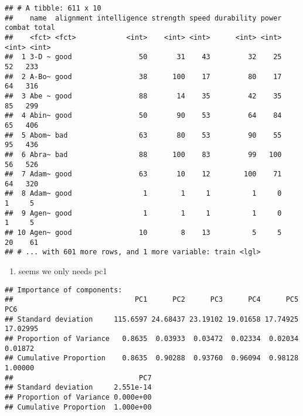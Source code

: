 \documentclass[]{article}
\newenvironment{Shaded}{\begin{snugshade}}{\end{snugshade}}
\newcommand{\DecValTok}[1]{\textcolor[rgb]{0.00,0.00,0.81}{#1}}
\newcommand{\KeywordTok}[1]{\textcolor[rgb]{0.13,0.29,0.53}{\textbf{#1}}}
\newcommand{\NormalTok}[1]{#1}
\newcommand{\OperatorTok}[1]{\textcolor[rgb]{0.81,0.36,0.00}{\textbf{#1}}}
\newcommand{\StringTok}[1]{\textcolor[rgb]{0.31,0.60,0.02}{#1}}
\providecommand{\tightlist}{%
  \setlength{\itemsep}{0pt}\setlength{\parskip}{0pt}}
\begin{document}
\begin{verbatim}
## # A tibble: 611 x 10
##    name  alignment intelligence strength speed durability power combat total
##    <fct> <fct>            <int>    <int> <int>      <int> <int>  <int> <int>
##  1 3-D ~ good                50       31    43         32    25     52   233
##  2 A-Bo~ good                38      100    17         80    17     64   316
##  3 Abe ~ good                88       14    35         42    35     85   299
##  4 Abin~ good                50       90    53         64    84     65   406
##  5 Abom~ bad                 63       80    53         90    55     95   436
##  6 Abra~ bad                 88      100    83         99   100     56   526
##  7 Adam~ good                63       10    12        100    71     64   320
##  8 Adam~ good                 1        1     1          1     0      1     5
##  9 Agen~ good                 1        1     1          1     0      1     5
## 10 Agen~ good                10        8    13          5     5     20    61
## # ... with 601 more rows, and 1 more variable: train <lgl>
\end{verbatim}

\begin{enumerate}
\def\labelenumi{\arabic{enumi}.}
\setcounter{enumi}{1}
\tightlist
\item
  seems we only needs pc1
\end{enumerate}

\begin{Shaded}
\end{Shaded}

\begin{verbatim}
## Importance of components:
##                             PC1      PC2      PC3      PC4      PC5      PC6
## Standard deviation     115.6597 24.68437 23.19102 19.01658 17.74925 17.02995
## Proportion of Variance   0.8635  0.03933  0.03472  0.02334  0.02034  0.01872
## Cumulative Proportion    0.8635  0.90288  0.93760  0.96094  0.98128  1.00000
##                              PC7
## Standard deviation     2.551e-14
## Proportion of Variance 0.000e+00
## Cumulative Proportion  1.000e+00
\end{verbatim}
\end{document}
